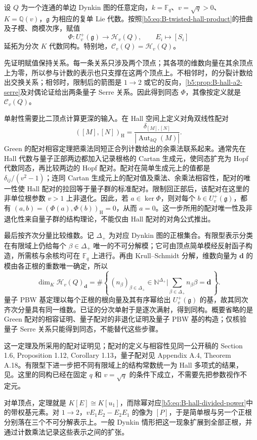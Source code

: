 \begin{theorem}\label{b5:thm:B-ringel-dynkin}
	设 \(Q\) 为一个连通的单边 Dynkin 图的任意定向，\(k=\mathbb F_q\)、\(v=\sqrt q>0\)、\(K=\mathbb Q(v)\)，\(\mathfrak g\) 为相应的复单 Lie 代数。按照\eqref{b5:eq:B-twisted-hall-product}的扭曲及子模、商模次序，赋值
	\[
		\Phi:U_v^+(\mathfrak g)\longrightarrow\mathcal H_v(Q),
		\qquad E_i\longmapsto[S_i]
	\]
	延拓为分次 \(K\) 代数同构。特别地，\(\mathcal C_v(Q)=\mathcal H_v(Q)\)。
\end{theorem}
\begin{proofsketch}
	先证明赋值保持关系。每一条关系只涉及两个顶点；其各项的维数向量在其余顶点上为零，所以参与计数的表示也只支撑在这两个顶点上。不相邻时，的分裂计数给出交换关系；相邻时，限制后的箭图是 \(1\to2\) 或它的反向，\cref{b5:prop:B-hall-a2-serre}及对偶论证给出两条量子 Serre 关系。因此得到同态 \(\Phi\)，其像按定义就是 \(\mathcal C_v(Q)\)。

	单射性需要比二顶点计算更深的输入。在 Hall 空间上定义对角双线性配对
	\[
		([M],[N])_{\mathrm H}
		=\frac{\delta_{[M],[N]}}{|\operatorname{Aut}_{kQ}(M)|}.
	\]
	Green 的配对相容定理把乘法同短正合列计数给出的余乘法联系起来。通常先在 Hall 代数与量子正部两边都加入记录根格的 Cartan 生成元，使同态扩充为 Hopf 代数同态，再比较两边的 Hopf 配对。配对在简单生成元上的值都是 \(\delta_{ij}/(v^2-1)\)；连同 Cartan 生成元上的配对值及乘法、余乘法相容性，配对的唯一性使 Hall 配对的拉回等于量子群的标准配对。限制回正部后，该配对在这里的非单位根参数 \(v>1\) 上非退化。因此，若 \(a\in\ker\Phi\)，则对每个 \(b\in U_v^+(\mathfrak g)\)，都有 \((a,b)=(\Phi(a),\Phi(b))_{\mathrm H}=0\)，从而 \(a=0\)。这一步所用的配对唯一性及非退化性来自量子群的结构理论，不能仅由 Hall 配对的对角公式推出。

	最后按齐次分量比较维数。记 \(\Delta_+\) 为对应 Dynkin 图的正根集合。有限型表示分类在有限域上仍给每个 \(\beta\in\Delta_+\) 唯一的不可分解模；它可由顶点简单模经反射函子构造，所需核与余核均可在 \(\mathbb F_q\) 上进行。再由 Krull--Schmidt 分解，维数向量为 \(\mathbf d\) 的模由各正根的重数唯一确定，所以
	\[
		\dim_K\mathcal H_v(Q)_{\mathbf d}
		=\#\left\{\,(n_\beta)_{\beta\in\Delta_+}\in\mathbb N^{\Delta_+}
		\mathrel{\Big|}\sum_{\beta\in\Delta_+}n_\beta\beta=\mathbf d\,\right\}.
	\]
	量子 PBW 基定理以每个正根的根向量及其有序幂给出 \(U_v^+(\mathfrak g)\) 的基，故其同次齐次分量具有同一维数。已证的分次单射于是逐次满射，得到同构。概要省略的是 Green 配对的相容证明、量子配对的非退化证明及量子 PBW 基的构造；仅核验量子 Serre 关系只能得到同态，不能替代这些步骤。
\end{proofsketch}
这一定理及所采用的配对证明见\cite[作者公开稿, Section 3.3, Theorem 3.16, Remarks 3.17(i)--(ii)]{Schiffmann2012HallAlgebras}；配对的定义与相容性见同一公开稿的 Section 1.6, Proposition 1.12, Corollary 1.13，量子配对见 Appendix A.4, Theorem A.18。有限型下进一步把不同有限域上的结构常数统一为 Hall 多项式的结果，见\cite[作者公开稿, Section 3.4, Proposition 3.18]{Schiffmann2012HallAlgebras}。这里的同构已经在固定 \(q\) 和 \(v=\sqrt q\) 的条件下成立，不需要先把参数视作不定元。

\ProseParagraphBreak
对单顶点，定理就是 \(K[E]\cong K[u_1]\)，而除幂对应\eqref{b5:eq:B-hall-divided-power}中的带权基元素。对 \(1\to2\)，\(vE_1E_2-E_2E_1\) 的像为 \([P]\)，于是简单根与另一个正根分别落在三个不可分解表示上。一般 Dynkin 情形把这一现象扩展到全部正根，并通过计数乘法记录这些表示之间的扩张。

